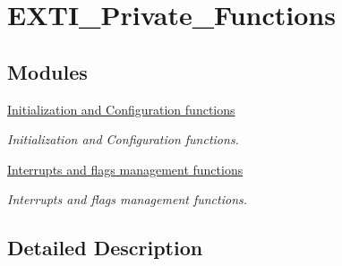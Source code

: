 \hypertarget{group___e_x_t_i___private___functions}{}\section{E\+X\+T\+I\+\_\+\+Private\+\_\+\+Functions}
\label{group___e_x_t_i___private___functions}
\subsection*{Modules}
\begin{DoxyCompactItemize}
\item 
\hyperlink{group___e_x_t_i___group1}{Initialization and Configuration functions}
\begin{DoxyCompactList}\small\item\em Initialization and Configuration functions. \end{DoxyCompactList}\item 
\hyperlink{group___e_x_t_i___group2}{Interrupts and flags management functions}
\begin{DoxyCompactList}\small\item\em Interrupts and flags management functions. \end{DoxyCompactList}\end{DoxyCompactItemize}


\subsection{Detailed Description}
